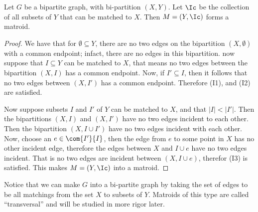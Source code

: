 \begin{lemma}\label{1.1.6}
    Let $G$ be a bipartite graph, with bi-partition $(X,Y)$. Let $\Ic$ be the
    collection of all subsets of  $Y$ that can be matched to $X$. Then
    $M=(Y, \Ic)$ forms a matroid.
\end{lemma}
\begin{proof}
    We have that for $\emptyset \subseteq Y$, there are no two edges on the
    bipartition $(X,\emptyset)$ with a common endpoint; infact, there are no
    edges in this bipartition. now suppose that $I \subseteq Y$ can be matched
    to  $X$, that means no two edges between the bipartition  $(X,I)$ has a
    common endpoint. Now, if $I' \subseteq I$, then it follows that no two edges
    between  $(X,I')$ has a common endpoint. Therefore (I1), and (I2) are
    satisfied.

    Now suppose subsets $I$ and  $I'$ of $Y$ can be matched to $X$, and that
    $|I|<|I'|$. Then the bipartitions $(X,I)$ and $(X,I')$ have no two edges
    incident to each other. Then the bipartition $(X,I \cup I')$ have no two
    edges incident with each other. Now, choose an $e \in \com{I'}{I}$, then the
    edge from $e$ to some point in  $X$ has no other incident edge, therefore
    the edges between  $X$ and  $I \cup e$ have no two edges incident. That is
    no two edges are incident between $(X, I \cup e)$, therefor (I3) is
    satisfied. This makes $M=(Y,\Ic)$ into a matroid.
\end{proof}
\begin{remark}
    Notice that we can make $G$ into a bi-partite graph by taking the set of
    edges to be all matchings from the set  $X$ to subsets of  $Y$. Matroids of
    this type are called ``transversal'' and will be studied in more rigor later.
\end{remark}
